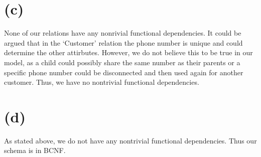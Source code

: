 \documentclass{article}
\begin{document}
\section*{(c)}
None of our relations have any nonrivial functional dependencies. It could be argued that in the `Customer' relation the phone number is unique and could determine the other attirbutes. However, we do not believe this to be true in our model, as a child could possibly share the same number as their parents or a specific phone number could be disconnected and then used again for another customer. Thus, we have no nontrivial functional dependencies.

\section*{(d)}
As stated above, we do not have any nontrivial functional dependencies. Thus our schema is in BCNF.
\end{document}
